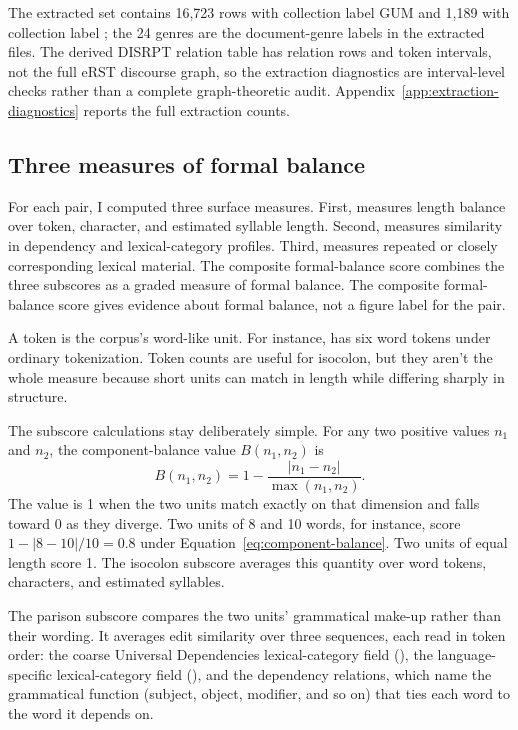 \documentclass[12pt]{article}
\begin{document}
The extracted set contains 16,723 rows with collection label GUM and 1,189
with collection label ; the 24 genres are the
document-genre labels in the extracted files. The derived DISRPT relation
table has relation rows and token intervals, not the full eRST discourse
graph, so the extraction diagnostics are interval-level checks rather than
a complete graph-theoretic audit. Appendix~\ref{app:extraction-diagnostics}
reports the full extraction counts.

\subsection{Three measures of formal balance}

For each pair, I computed three surface measures. First,
 measures length balance over token, character,
and estimated syllable length. Second,  measures
similarity in dependency and lexical-category profiles. Third,
 measures repeated or closely corresponding lexical
material. The composite formal-balance score combines the three subscores
as a graded measure of formal balance. The composite formal-balance score
gives evidence about formal balance, not a figure label for the pair.

A token is the corpus's word-like unit. For instance,
 has six word tokens under ordinary
tokenization. Token counts are useful for isocolon, but they aren't the
whole measure because short units can match in length while differing
sharply in structure.

The subscore calculations stay deliberately simple. For any two positive
values \(n_1\) and \(n_2\), the component-balance value \(B(n_1,n_2)\) is
\begin{equation}
\label{eq:component-balance}
B(n_1,n_2) = 1 - \frac{|n_1 - n_2|}{\max(n_1,n_2)}.
\end{equation}
The value is 1 when the two units match exactly on that dimension and
falls toward 0 as they diverge. Two units of 8 and 10 words, for instance,
score \(1 - |8-10|/10 = 0.8\) under Equation~\ref{eq:component-balance}.
Two units of equal length
score 1. The isocolon subscore averages this quantity over word tokens,
characters, and estimated syllables.

The parison subscore compares the two units' grammatical make-up rather
than their wording. It averages edit similarity over three sequences, each
read in token order: the coarse Universal Dependencies lexical-category
field (), the language-specific lexical-category field
(), and the dependency relations, which name the grammatical function
(subject, object, modifier, and so on) that ties each word to the word it
depends on.
\end{document}
